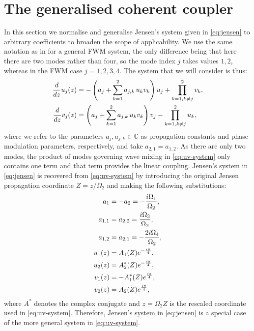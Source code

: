 \documentclass[11pt,a4paper]{article}
\numberwithin{equation}{section}
\begin{document}
\section{The generalised coherent coupler}
In this section we normalise and generalise Jensen's system given in \eqref{eq:jensen} to arbitrary coefficients to broaden the scope of applicability.
We use the same notation as in \cite{heskethCompleteWeierstrassElliptic2026} for a general FWM system, the only difference being that here there are two modes rather than four, so the mode index $j$ takes values $1,2$, whereas in the FWM case $j=1,2,3,4$. 
The system that we will consider is thus:
\begin{align}
\frac{d}{d z} u_j{\left(z \right)} &= - \left({a}_{j} + \sum_{k=1}^{2} {a}_{j,k}\,u_k v_k \right) u_j + \prod\limits_{k=1, k \ne j}^{2} v_k, \notag \\
\frac{d}{d z} v_j{\left(z \right)} &= \left({a}_{j} + \sum_{k=1}^{2} {a}_{j,k}\,u_k v_k \right) v_j - \prod\limits_{k=1, k \ne j}^{2} u_k, \label{eq:uv-system}
\end{align}
where we refer to the parameters $a_j, a_{j,k} \in \mathbb{C}$ as propagation constants and phase modulation parameters, respectively, and take $a_{2,1} = a_{1,2}$.
As there are only two modes, the product of modes governing wave mixing in \eqref{eq:uv-system} only contains one term and that term provides the linear coupling. 
Jensen's system in \eqref{eq:jensen} is recovered from \eqref{eq:uv-system} by introducing the original Jensen propagation coordinate $Z=z/\Omega_2$ and making the following substitutions:
\begin{align}
a_1 &= - a_2 = - \frac{i {\Omega}_{1}}{{\Omega}_{2}}, \notag \\
a_{1,1} &= a_{2,2} = \frac{i {\Omega}_{3}}{{\Omega}_{2}}, \notag \\
a_{1,2} &= a_{2,1} = - \frac{2 i {\Omega}_{4}}{{\Omega}_{2}}, \notag \\
u_1(z) &= A_1{\left(Z\right)} e^{- \frac{i \pi}{4}}, \notag \\
u_2(z) &= A^{*}_2{\left(Z\right)} e^{- \frac{i \pi}{4}}, \notag \\
v_1(z) &= -A^{*}_1{\left(Z\right)} e^{\frac{i \pi}{4}}, \notag \\
v_2(z) &= A_2{\left(Z\right)} e^{\frac{i \pi}{4}}, \label{eq:uv-to-jensen}
\end{align}
where $A^*$ denotes the complex conjugate and $z=\Omega_2 Z$ is the rescaled coordinate used in \eqref{eq:uv-system}.
Therefore, Jensen's system in \eqref{eq:jensen} is a special case of the more general system in \eqref{eq:uv-system}.
\end{document}

